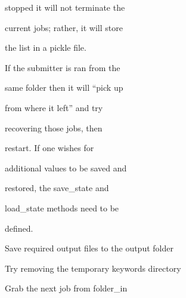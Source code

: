 \documentclass[letterpaper,10pt,english]{sphinxmanual}
\begin{document}
\begin{fulllineitems}
\begin{DUlineblock}{0em}
\begin{DUlineblock}{\DUlineblockindent}
\item[]
\begin{DUlineblock}{\DUlineblockindent}
\item[] stopped it will not terminate the
\item[] current jobs; rather, it will store
\item[] the list in a pickle file.
\item[] If the submitter is ran from the
\item[] same folder then it will ``pick up
\item[] from where it left'' and try
\item[] recovering those jobs, then
\item[] restart. If one wishes for
\item[] additional values to be saved and
\item[] restored, the save\_state and
\item[] load\_state methods need to be
\item[] defined.
\end{DUlineblock}
\end{DUlineblock}
\end{DUlineblock}

\begin{fulllineitems}
\label{doctree/soprano.hpc.submitter.castep:soprano.hpc.submitter.castep.CastepSubmitter.finish_job}
Save required output files to the output folder

\end{fulllineitems}


\begin{fulllineitems}
\label{doctree/soprano.hpc.submitter.castep:soprano.hpc.submitter.castep.CastepSubmitter.finish_run}
Try removing the temporary keywords directory

\end{fulllineitems}


\begin{fulllineitems}
\label{doctree/soprano.hpc.submitter.castep:soprano.hpc.submitter.castep.CastepSubmitter.next_job}
Grab the next job from folder\_in


\end{fulllineitems}
\end{fulllineitems}
\end{document}
